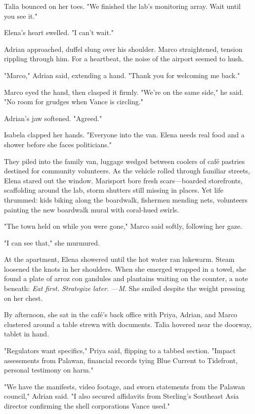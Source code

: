 Talia bounced on her toes. "We finished the lab's monitoring array. Wait until you see it."

Elena's heart swelled. "I can't wait."

Adrian approached, duffel slung over his shoulder. Marco straightened, tension rippling through him. For a heartbeat, the noise of the airport seemed to hush.

"Marco," Adrian said, extending a hand. "Thank you for welcoming me back."

Marco eyed the hand, then clasped it firmly. "We're on the same side," he said. "No room for grudges when Vance is circling."

Adrian's jaw softened. "Agreed."

Isabela clapped her hands. "Everyone into the van. Elena needs real food and a shower before she faces politicians."

They piled into the family van, luggage wedged between coolers of café pastries destined for community volunteers. As the vehicle rolled through familiar streets, Elena stared out the window. Marisport bore fresh scars—boarded storefronts, scaffolding around the lab, storm shutters still missing in places. Yet life thrummed: kids biking along the boardwalk, fishermen mending nets, volunteers painting the new boardwalk mural with coral-hued swirls.

"The town held on while you were gone," Marco said softly, following her gaze.

"I can see that," she murmured.

\bigskip

At the apartment, Elena showered until the hot water ran lukewarm. Steam loosened the knots in her shoulders. When she emerged wrapped in a towel, she found a plate of arroz con gandules and plantains waiting on the counter, a note beneath: \textit{Eat first. Strategize later. —M}. She smiled despite the weight pressing on her chest.

By afternoon, she sat in the café's back office with Priya, Adrian, and Marco clustered around a table strewn with documents. Talia hovered near the doorway, tablet in hand.

"Regulators want specifics," Priya said, flipping to a tabbed section. "Impact assessments from Palawan, financial records tying Blue Current to Tidefront, personal testimony on harm."

"We have the manifests, video footage, and sworn statements from the Palawan council," Adrian said. "I also secured affidavits from Sterling's Southeast Asia director confirming the shell corporations Vance used."


